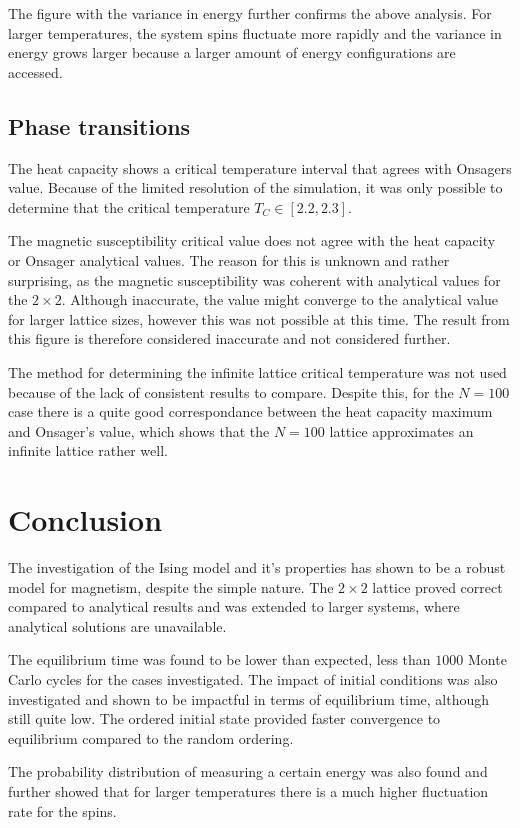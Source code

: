 \documentclass[aps,reprint]{revtex4-1}
\begin{document}
The figure with the variance in energy further confirms the above analysis. For
larger temperatures, the system spins fluctuate more rapidly and the variance in energy
grows larger because a larger amount of energy configurations are accessed.

\subsection{Phase transitions}
The heat capacity shows a critical temperature interval that agrees with Onsagers
value. Because of the limited resolution of the simulation, it was only possible
to determine that the critical temperature $T_C \in [2.2, 2.3]$.

The magnetic susceptibility critical value does not agree with the heat capacity
or Onsager analytical values. The reason for this is unknown and rather surprising,
as the magnetic susceptibility was coherent with analytical values for the $2 \times 2$.
Although inaccurate, the value might converge to the analytical value for larger
lattice sizes, however this was not possible at this time. The result from this
figure is therefore considered inaccurate and not considered further.

The method for determining the infinite lattice critical temperature was not used
because of the lack of consistent results to compare. Despite this, for the
$N = 100$ case there is a quite good correspondance between the heat capacity
maximum and Onsager's value, which shows that the $N = 100$ lattice approximates
an infinite lattice rather well.

\section{Conclusion} \label{sec:conclusion}
The investigation of the Ising model and it's properties has shown to be a robust
model for magnetism, despite the simple nature. The $2 \times 2$ lattice
proved correct compared to analytical results and was extended to larger systems,
where analytical solutions are unavailable.

The equilibrium time was found to be lower than expected, less than $1000$ Monte Carlo cycles for the cases investigated.
The impact of initial conditions was also investigated and shown to be impactful
in terms of equilibrium time, although still quite low. The ordered initial state
provided faster convergence to equilibrium compared to the random ordering.

The probability distribution
of measuring a certain energy was also found and further showed that for larger
temperatures there is a much higher fluctuation rate for the spins.
\end{document}

